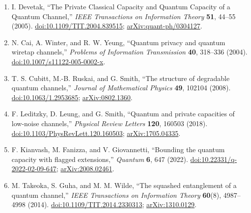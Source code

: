 \begin{enumerate}[label={},leftmargin=4.8em,labelsep=0.5em]
  \footnotesize
  \item[\textup{[Dev05]}]\label{ref:pd-devetak}
  I. Devetak, ``The Private Classical Capacity and Quantum Capacity of a
  Quantum Channel,'' \emph{IEEE Transactions on Information Theory}
  \textbf{51}, 44--55 (2005).
  \href{https://doi.org/10.1109/TIT.2004.839515}{doi:10.1109/TIT.2004.839515};
  \href{https://arxiv.org/abs/quant-ph/0304127}{arXiv:quant-ph/0304127}.

  \item[\textup{[CWY04]}]\label{ref:pd-cai-winter-yeung}
  N. Cai, A. Winter, and R. W. Yeung, ``Quantum privacy and quantum wiretap
  channels,'' \emph{Problems of Information Transmission} \textbf{40},
  318--336 (2004).
  \href{https://doi.org/10.1007/s11122-005-0002-x}{doi:10.1007/s11122-005-0002-x}.

  \item[\textup{[CRS08]}]\label{ref:pd-cubitt-ruskai-smith}
  T. S. Cubitt, M.-B. Ruskai, and G. Smith, ``The structure of degradable
  quantum channels,'' \emph{Journal of Mathematical Physics} \textbf{49},
  102104 (2008).
  \href{https://doi.org/10.1063/1.2953685}{doi:10.1063/1.2953685};
  \href{https://arxiv.org/abs/0802.1360}{arXiv:0802.1360}.

  \item[\textup{[LLS18]}]\label{ref:pd-leditzky-leung-smith}
  F. Leditzky, D. Leung, and G. Smith, ``Quantum and private capacities of
  low-noise channels,'' \emph{Physical Review Letters} \textbf{120},
  160503 (2018).
  \href{https://doi.org/10.1103/PhysRevLett.120.160503}{doi:10.1103/PhysRevLett.120.160503};
  \href{https://arxiv.org/abs/1705.04335}{arXiv:1705.04335}.

  \item[\textup{[KFG22]}]\label{ref:pd-kianvash-fanizza-giovannetti}
  F. Kianvash, M. Fanizza, and V. Giovannetti, ``Bounding the quantum
  capacity with flagged extensions,'' \emph{Quantum} \textbf{6}, 647
  (2022).
  \href{https://doi.org/10.22331/q-2022-02-09-647}{doi:10.22331/q-2022-02-09-647};
  \href{https://arxiv.org/abs/2008.02461}{arXiv:2008.02461}.

  \item[\textup{[TGW14]}]\label{ref:pd-takeoka-guha-wilde}
  M. Takeoka, S. Guha, and M. M. Wilde, ``The squashed entanglement of a
  quantum channel,'' \emph{IEEE Transactions on Information Theory}
  \textbf{60}(8), 4987--4998 (2014).
  \href{https://doi.org/10.1109/TIT.2014.2330313}{doi:10.1109/TIT.2014.2330313};
  \href{https://arxiv.org/abs/1310.0129}{arXiv:1310.0129}.


\end{enumerate}
